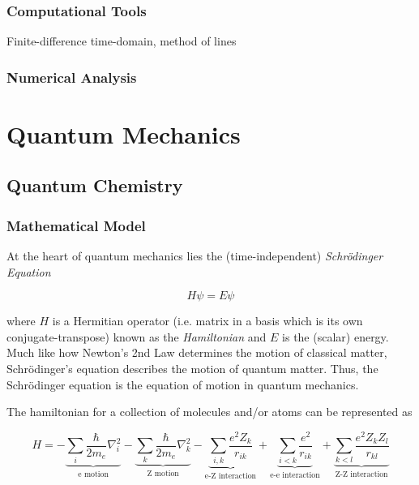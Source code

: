 \documentclass{report}
\begin{document}
        \subsection{Computational Tools}

            Finite-difference time-domain, method of lines

        \subsection{Numerical Analysis}

\chapter{Quantum Mechanics} \label{sec:quantum}

\pagebreak

    \section{Quantum Chemistry}

        \subsection{Mathematical Model}

            At the heart of quantum mechanics lies the (time-independent) \emph{Schr{\"o}dinger Equation}

            \begin{equation}
                H \psi = E \psi
            \end{equation}

            where $H$ is a Hermitian operator (i.e. matrix in a basis which is its own conjugate-transpose) known as the \emph{Hamiltonian} and $E$ is the (scalar) energy.  Much like how Newton's 2nd Law determines the motion of classical matter, Schr{\"o}dinger's equation describes the motion of quantum matter.  Thus, the Schr{\"o}dinger equation is the equation of motion in quantum mechanics.
            
            The hamiltonian for a collection of molecules and/or atoms can be represented as\cite{cramer2013essentials}

            \begin{equation}
                H = -\underbrace{\sum_i \frac{\hbar}{2 m_e} \nabla_i^2}_{\text{e motion}} - \underbrace{\sum_k \frac{\hbar}{2 m_e} \nabla_k^2}_{\text{Z motion}} - \underbrace{\sum_{i,k} \frac{e^2 Z_k}{r_{ik}}}_{\text{e-Z interaction}} + \underbrace{\sum_{i < k} \frac{e^2}{r_{ik}}}_{\text{e-e interaction}} + \underbrace{\sum_{k < l} \frac{e^2 Z_k Z_l}{r_{kl}}}_{\text{Z-Z interaction}}
            \end{equation}
\end{document}
